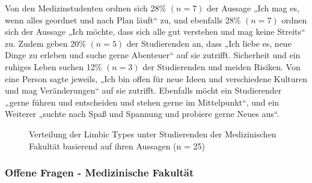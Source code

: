 \documentclass[german,report]{i1thesis}
\begin{document}
Von den Medizinstudenten ordnen sich 28\% \((n=7)\) der Aussage „Ich mag es, wenn alles geordnet und nach Plan läuft“ zu, und ebenfalls 28\% \((n=7)\) ordnen sich der Aussage „Ich möchte, dass sich alle gut verstehen und mag keine Streits“ zu. Zudem geben 20\% \((n=5)\) der Studierenden an, dass „Ich liebe es, neue Dinge zu erleben und suche gerne Abenteuer“ auf sie zutrifft. Sicherheit und ein ruhiges Leben suchen 12\% \((n=3)\) der Studierenden und meiden Risiken. Von eine Person sagte jeweils, „Ich bin offen für neue Ideen und verschiedene Kulturen und mag Veränderungen“ auf sie zutrifft. Ebenfalls möcht ein Studierender „gerne führen und entscheiden und stehen gerne im Mittelpunkt“, und ein Weiterer „suchte nach Spaß und Spannung und probiere gerne Neues aus“.

\begin{figure}[H]
\centering
{}
\caption{Verteilung der Limbic Types \cite{hausel2011wissenschaftliche} unter Studierenden der Medizinischen Fakultät basierend auf ihren Aussagen (n = 25)}
\label{fig:limbic_types}
\end{figure}

\subsubsection{Offene Fragen - Medizinische Fakultät}
\end{document}
